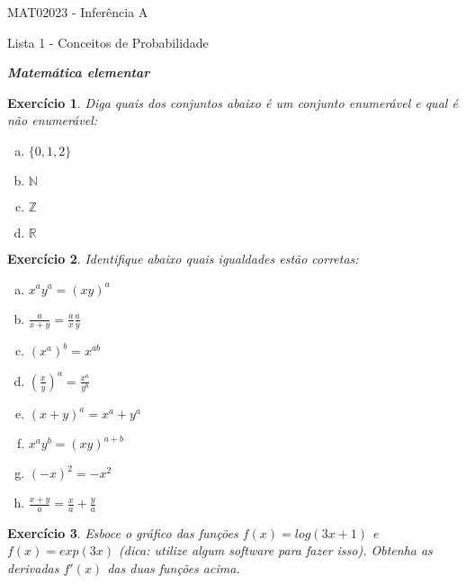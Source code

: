 \documentclass[letter,11pt]{article}
\newtheorem{exer}{Exercício}
\begin{document}
\begin{center}{ \Large MAT02023 - Inferência A }\end{center}

\begin{center}
{\large  \sc Lista 1 - Conceitos de Probabilidade}
\end{center}
\vspace{15mm}


\noindent \textit{\textbf{Matemática elementar}}

\medskip
\begin{exer} \rm
\item Diga quais dos conjuntos abaixo é um conjunto enumerável e qual é não enumerável:

  \begin{enumerate}[a)]
    \item $\{0,1,2\}$
    \item $\mathbb{N}$
    \item $\mathbb{Z}$
    \item $\mathbb{R}$
  \end{enumerate}
\end{exer}


\medskip
\begin{exer} \rm
Identifique abaixo quais igualdades estão corretas:
  \begin{enumerate}[a)]
   \item $x^ay^a= (xy)^a$
   \item $\frac{a}{x+y}=\frac{a}{x}\frac{a}{y}$
   \item $(x^a)^b = x^{ab}$
   \item $(\frac{x}{y})^a=\frac{x^a}{y^b}$
   \item $(x+y)^a= x^a+ y^a$
   \item $x^ay^b= (xy)^{a+b}$
   \item $(-x)^2= -x^2$
   \item $\frac{x+y}{a}=\frac{x}{a}+\frac{y}{a}$ 
  \end{enumerate}
\end{exer}


\medskip
\begin{exer} \rm
Esboce o gráfico das funções $f(x) = log(3x+1)$ e $f(x) = exp(3x)$ (dica: utilize algum software para fazer isso). Obtenha as derivadas $f'(x)$ das duas funções acima.
\end{exer}
\end{document}
